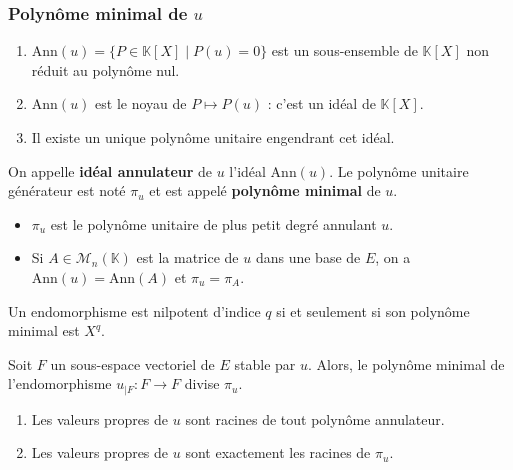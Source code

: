   \subsubsection{Polynôme minimal de \texorpdfstring{$u$}{u}}


  \begin{lemma}
    \begin{enumerate}[label={\bfseries(\roman*)}]
      \item $\mathrm{Ann}(u) = \{ P \in \mathbb{K}[X] \mid P(u) = 0 \}$ est un sous-ensemble de $\mathbb{K}[X]$ non réduit au polynôme nul.
      \item $\mathrm{Ann}(u)$ est le noyau de $P \mapsto P(u)$ : c'est un idéal de $\mathbb{K}[X]$.
      \item Il existe un unique polynôme unitaire engendrant cet idéal.
    \end{enumerate}
  \end{lemma}

  \begin{definition}
    On appelle \textbf{idéal annulateur} de $u$ l'idéal $\mathrm{Ann}(u)$. Le polynôme unitaire générateur est noté $\pi_u$ et est appelé \textbf{polynôme minimal} de $u$.
  \end{definition}

  \begin{remark}
    \begin{itemize}
      \item $\pi_u$ est le polynôme unitaire de plus petit degré annulant $u$.
      \item Si $A \in \mathcal{M}_n(\mathbb{K})$ est la matrice de $u$ dans une base de $E$, on a $\mathrm{Ann}(u) = \mathrm{Ann}(A)$ et $\pi_u = \pi_A$.
    \end{itemize}
  \end{remark}

  \begin{example}
    Un endomorphisme est nilpotent d'indice $q$ si et seulement si son polynôme minimal est $X^q$.
  \end{example}

  \begin{proposition}
    Soit $F$ un sous-espace vectoriel de $E$ stable par $u$. Alors, le polynôme minimal de l'endomorphisme $u_{|F} : F \rightarrow F$ divise $\pi_u$.
  \end{proposition}

  \begin{proposition}
    \begin{enumerate}[label={\bfseries(\roman*)}]
      \item Les valeurs propres de $u$ sont racines de tout polynôme annulateur.
      \item Les valeurs propres de $u$ sont exactement les racines de $\pi_u$.
    \end{enumerate}
  \end{proposition}

